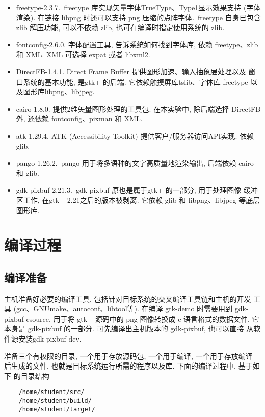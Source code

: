 \begin{itemize}
  \item freetype-2.3.7.\ freetype 库实现矢量字体TrueType、Type1显示效果支持
      (字体渲染). 在链接 libpng 时还可以支持 png 压缩的点阵字体.\ freetype
      自身已包含 zlib 解压功能, 可以不依赖 zlib, 也可在编译时指定使用系统的
      zlib.

  \item fontconfig-2.6.0. 字体配置工具, 告诉系统如何找到字体库, 依赖
      freetype、zlib 和 XML. XML 可选择 expat 或者 libxml2.

  \item DirectFB-1.4.1. Direct Frame Buffer 提供图形加速、输入抽象层处理以及
      窗口系统的基本功能, 是gtk+ 的后端. 它依赖触摸屏库tslib、字体库 freetype
      以及图形库libpng、libjpeg.

  \item cairo-1.8.0. 提供2维矢量图形处理的工具包. 在本实验中, 除后端选择
      DirectFB外, 还依赖 fontconfig、pixman 和 XML.\@

  \item atk-1.29.4. ATK (Accessibility Toolkit) 提供客户/服务器访问API实现.
      依赖 glib.

  \item pango-1.26.2.\ pango 用于将多语种的文字高质量地渲染输出, 后端依赖
      cairo 和 glib.

  \item gdk-pixbuf-2.21.3.\ gdk-pixbuf 原也是属于gtk+ 的一部分, 用于处理图像
      缓冲区工作, 在gtk+-2.21之后的版本被剥离. 它依赖 glib 和 libpng、libjpeg
      等底层图形库.
\end{itemize}

\section{编译过程}
\subsection{编译准备}
    主机准备好必要的编译工具, 包括针对目标系统的交叉编译工具链和主机的开发
工具 (gcc、GNUmake、autoconf、libtool等). 在编译 gtk-demo 时需要用到
gdk-pixbuf-csource, 用于将 gtk+ 源码中的 png 图像转换成 c 语言格式的数据文件.
它本身是 gdk-pixbuf 的一部分. 可先编译出主机版本的 gdk-pixbuf, 也可以直接
从软件源安装gdk-pixbuf-dev.

    准备三个有权限的目录, 一个用于存放源码包, 一个用于编译, 一个用于存放编译
后生成的文件, 也就是目标系统运行所需的程序以及库. 下面的编译过程中, 基于如下
的目录结构

\begin{verbatim}
    /home/student/src/
    /home/student/build/
    /home/student/target/
\end{verbatim}

